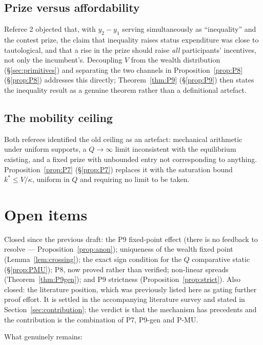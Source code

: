 \documentclass[11pt]{article}
\begin{document}
\subsection{Prize versus affordability}
\label{sec:R2-affordability}
Referee 2 objected that, with $y_2-y_1$ serving simultaneously as
``inequality'' and the contest prize, the claim that inequality raises
status expenditure was close to tautological, and that a rise in the
prize should raise \emph{all} participants' incentives, not only the
incumbent's. Decoupling $V$ from the wealth distribution
(\S\ref{sec:primitives}) and separating the two channels in
Proposition~\ref{prop:P8} (\S\ref{prop:P8}) addresses this directly;
Theorem~\ref{thm:P9} (\S\ref{prop:P9}) then states the
inequality result as a genuine theorem rather than a definitional
artefact.

\subsection{The mobility ceiling}
\label{sec:ceiling}
Both referees identified the old ceiling as an artefact: mechanical
arithmetic under uniform supports, a $Q\to\infty$ limit inconsistent
with the equilibrium existing, and a fixed prize with unbounded entry
not corresponding to anything. Proposition~\ref{prop:P7}
(\S\ref{prop:P7}) replaces it with the saturation bound $k^*\le
V/\kappa$, uniform in $Q$ and requiring no limit to be taken.

\section{Open items}
\label{sec:open}

Closed since the previous draft: the P9 fixed-point effect (there is no
feedback to resolve --- Proposition~\ref{prop:anon}); uniqueness of the
wealth fixed point (Lemma~\ref{lem:crossing}); the exact sign condition for
the $Q$ comparative static (\S\ref{prop:PMU}); P8, now proved rather than
verified;
non-linear spreads (Theorem~\ref{thm:P9gen}); and P9 strictness
(Proposition~\ref{prop:strict}). Also closed: the literature position, which
was previously listed here as gating further proof effort. It is settled in the
accompanying literature survey and stated in
Section~\ref{sec:contribution}; the verdict is that the mechanism has
precedents and the contribution is the combination of P7, P9-gen and P-MU.

What genuinely remains:
\end{document}
